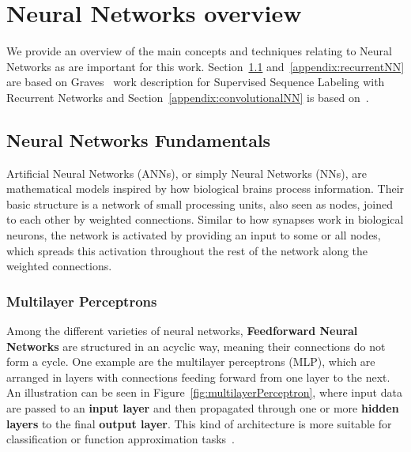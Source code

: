 \chapter{Neural Networks overview}
\label{appendix:neuralNetworks}
We provide an overview of the main concepts and techniques relating to Neural Networks as are 
important for this work. Section~\ref{appendix:fundamentalsNN} and~\ref{appendix:recurrentNN} 
are based on Graves~\cite{seqlab:Graves2012-385} work description for Supervised Sequence 
Labeling with Recurrent Networks and Section~\ref{appendix:convolutionalNN} is based 
on~\cite{appendix:OSheaN15}.

\section{Neural Networks Fundamentals}
\label{appendix:fundamentalsNN}
Artificial Neural Networks (ANNs), or simply Neural Networks (NNs), are mathematical models 
inspired by how biological brains process information. Their basic structure is a network of 
small processing units, also seen as nodes, joined to each other by weighted connections. 
Similar to how synapses work in biological neurons, the network is activated by providing an 
input to some or all nodes, which spreads this activation throughout the rest of the network 
along the weighted connections.

\subsection{Multilayer Perceptrons}
Among the different varieties of neural networks, \textbf{Feedforward Neural Networks} are 
structured in an acyclic way, meaning their connections do not form a cycle. One example are 
the multilayer perceptrons (MLP), which are arranged in layers with connections feeding 
forward from one layer to the next. An illustration can be seen in Figure~\ref{fig:multilayerPerceptron}, 
where input data are passed to an \textbf{input layer} and then propagated through one or more 
\textbf{hidden layers} to the final \textbf{output layer}. This kind of architecture is more 
suitable for classification or function approximation tasks~\cite{seqlab:Graves2012-385}.

